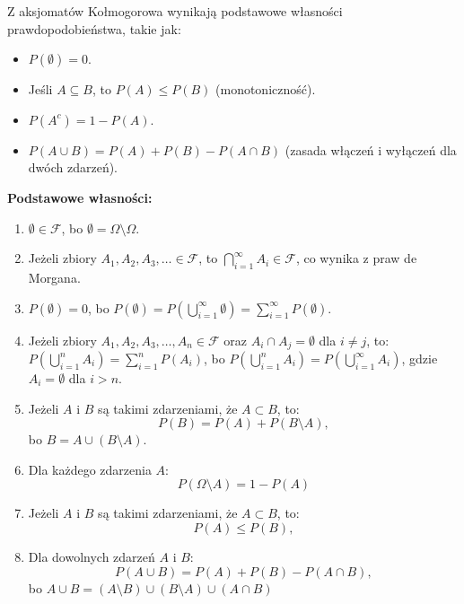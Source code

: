 \documentclass[final,a4paper,openany,12pt]{mwbk}
\begin{document}
Z aksjomatów Kołmogorowa wynikają podstawowe własności prawdopodobieństwa, takie jak:
\begin{itemize}
    \item $P(\emptyset) = 0$.
    \item Jeśli $A \subseteq B$, to $P(A) \le P(B)$ (monotoniczność).
    \item $P(A^c) = 1 - P(A)$.
    \item $P(A \cup B) = P(A) + P(B) - P(A \cap B)$ (zasada włączeń i wyłączeń dla dwóch zdarzeń).
\end{itemize}

\vspace{3mm}

\noindent\textbf{Podstawowe własności:}
\begin{enumerate}
    \item $\emptyset \in \mathcal{F}$, bo $\emptyset = \Omega \setminus \Omega$.

    \item Jeżeli zbiory $A_1, A_2, A_3, \dots \in \mathcal{F}$, to $\bigcap_{i=1}^{\infty} A_i \in \mathcal{F}$, co wynika z praw de Morgana.

    \item $P(\emptyset) = 0$, bo $P(\emptyset) = P\left(\bigcup_{i=1}^{\infty} \emptyset\right) = \sum_{i=1}^{\infty} P(\emptyset)$.

    \item Jeżeli zbiory $A_1, A_2, A_3, \dots, A_n \in \mathcal{F}$ oraz $A_i \cap A_j = \emptyset$ dla $i \neq j$, to:
    $P\left(\bigcup_{i=1}^{n} A_i\right) = \sum_{i=1}^{n} P(A_i)$, bo $P\left(\bigcup_{i=1}^{n} A_i\right) = P\left(\bigcup_{i=1}^{\infty} A_i\right)$, gdzie $A_i = \emptyset$ dla $i > n$.

    \item Jeżeli $A$ i $B$ są takimi zdarzeniami, że $A \subset B$, to:
    \[ P(B) = P(A) + P(B \setminus A), \] bo $B = A \cup (B \setminus A)$.

    \item Dla każdego zdarzenia $A$: \[ P(\Omega\setminus A) = 1 - P(A) \]

    \item Jeżeli $A$ i $B$ są takimi zdarzeniami, że $A \subset B$, to:
    \[ P(A) \leq P(B), \]

    \item Dla dowolnych zdarzeń $A$ i $B$:
    \[ P(A \cup B) = P(A) + P(B) - P(A \cap B), \] bo $A \cup B = (A \setminus B) \cup (B \setminus A) \cup (A \cap B)$
\end{enumerate}
\end{document}

